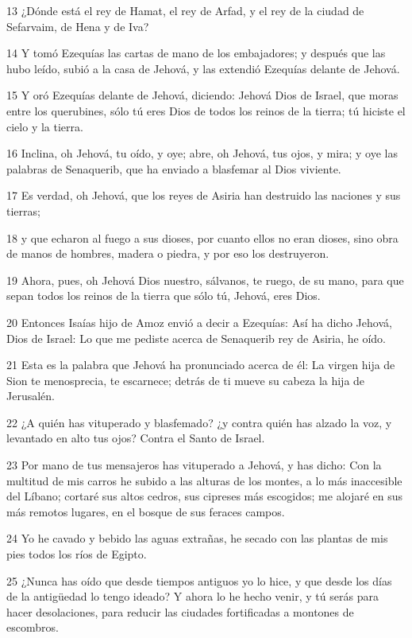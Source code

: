 \par 13 ¿Dónde está el rey de Hamat, el rey de Arfad, y el rey de la ciudad de Sefarvaim, de Hena y de Iva?
\par 14 Y tomó Ezequías las cartas de mano de los embajadores; y después que las hubo leído, subió a la casa de Jehová, y las extendió Ezequías delante de Jehová.
\par 15 Y oró Ezequías delante de Jehová, diciendo: Jehová Dios de Israel, que moras entre los querubines, sólo tú eres Dios de todos los reinos de la tierra; tú hiciste el cielo y la tierra.
\par 16 Inclina, oh Jehová, tu oído, y oye; abre, oh Jehová, tus ojos, y mira; y oye las palabras de Senaquerib, que ha enviado a blasfemar al Dios viviente.
\par 17 Es verdad, oh Jehová, que los reyes de Asiria han destruido las naciones y sus tierras;
\par 18 y que echaron al fuego a sus dioses, por cuanto ellos no eran dioses, sino obra de manos de hombres, madera o piedra, y por eso los destruyeron.
\par 19 Ahora, pues, oh Jehová Dios nuestro, sálvanos, te ruego, de su mano, para que sepan todos los reinos de la tierra que sólo tú, Jehová, eres Dios.
\par 20 Entonces Isaías hijo de Amoz envió a decir a Ezequías: Así ha dicho Jehová, Dios de Israel: Lo que me pediste acerca de Senaquerib rey de Asiria, he oído.
\par 21 Esta es la palabra que Jehová ha pronunciado acerca de él: La virgen hija de Sion te menosprecia, te escarnece; detrás de ti mueve su cabeza la hija de Jerusalén.
\par 22 ¿A quién has vituperado y blasfemado? ¿y contra quién has alzado la voz, y levantado en alto tus ojos? Contra el Santo de Israel.
\par 23 Por mano de tus mensajeros has vituperado a Jehová, y has dicho: Con la multitud de mis carros he subido a las alturas de los montes, a lo más inaccesible del Líbano; cortaré sus altos cedros, sus cipreses más escogidos; me alojaré en sus más remotos lugares, en el bosque de sus feraces campos.
\par 24 Yo he cavado y bebido las aguas extrañas, he secado con las plantas de mis pies todos los ríos de Egipto.
\par 25 ¿Nunca has oído que desde tiempos antiguos yo lo hice, y que desde los días de la antigüedad lo tengo ideado? Y ahora lo he hecho venir, y tú serás para hacer desolaciones, para reducir las ciudades fortificadas a montones de escombros.
